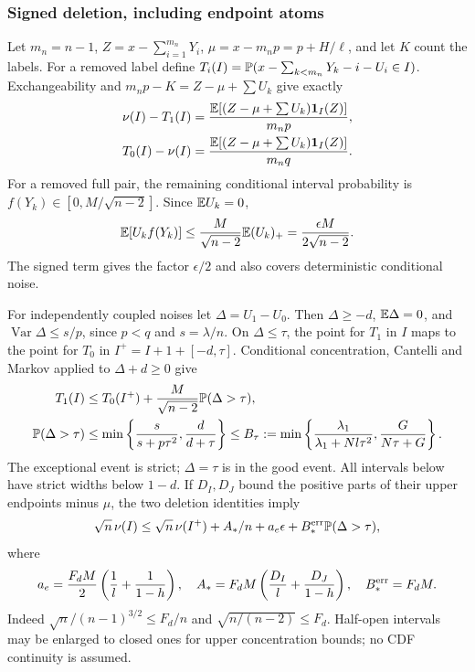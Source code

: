 \subsubsection{Signed deletion, including endpoint atoms}
\label{v9:confinement:deletion}
Let $m_n=n-1$, $Z=x-\sum_{i=1}^{m_n}Y_i$,
$\mu=x-m_np=p+H/\ell$, and let $K$ count the labels. For a removed label
define $T_i(I)=\mathbb P(x-\sum_{k<m_n}Y_k-i-U_i\in I)$.
Exchangeability and $m_np-K=Z-\mu+\sum U_k$ give exactly
\begin{align*}
 \nu(I)-T_1(I)&=\frac{\mathbb E[(Z-\mu+\sum U_k)\mathbf 1_I(Z)]}{m_np},\\
 T_0(I)-\nu(I)&=\frac{\mathbb E[(Z-\mu+\sum U_k)\mathbf 1_I(Z)]}{m_nq}.
\end{align*}
For a removed full pair, the remaining conditional interval probability
is $f(Y_k)\in[0,M/\sqrt{n-2}]$. Since $\mathbb E U_k=0$,
\[
 \mathbb E[U_kf(Y_k)]\le\frac{M}{\sqrt{n-2}}\mathbb E(U_k)_+
                  =\frac{\epsilon M}{2\sqrt{n-2}}.
\]
The signed term gives the factor $\epsilon/2$ and also covers
deterministic conditional noise.

For independently coupled noises let $\Delta=U_1-U_0$.
Then $\Delta\ge-d$, $\mathbb E\Delta=0$, and
$\operatorname{Var}\Delta\le s/p$, since $p<q$ and $s=\lambda/n$.
On $\Delta\le\tau$, the point for $T_1$ in $I$ maps to the point for
$T_0$ in $I^+=I+1+[-d,\tau]$. Conditional concentration, Cantelli and
Markov applied to $\Delta+d\ge0$ give
\begin{align}
 T_1(I)&\le T_0(I^+)+\frac M{\sqrt{n-2}}\mathbb P(\Delta>\tau),\notag\\
 \mathbb P(\Delta>\tau)&\le\min\left\{\frac{s}{s+p\tau^2},\frac d{d+\tau}\right\}
 \le B_\tau:=\min\left\{\frac{\lambda_1}{\lambda_1+Nl\tau^2},
                         \frac G{N\tau+G}\right\}.
 \label{v9:confinement:bad}
\end{align}
The exceptional event is strict; $\Delta=\tau$ is in the good event.
All intervals below have strict widths below $1-d$. If $D_I,D_J$
bound the positive parts of their upper endpoints minus $\mu$, the two
deletion identities imply
\begin{equation}\label{v9:confinement:deletion-error}
 \sqrt n\,\nu(I)\le\sqrt n\,\nu(I^+)+A_*/n+
             a_e\epsilon+B_*^{\rm err}\mathbb P(\Delta>\tau),
\end{equation}
where
\[
 a_e=\frac{F_dM}{2}\left(\frac1l+\frac1{1-h}\right),\quad
 A_*=F_dM\left(\frac{D_I}l+\frac{D_J}{1-h}\right),\quad
 B_*^{\rm err}=F_dM.
\]
Indeed $\sqrt n/(n-1)^{3/2}\le F_d/n$ and
$\sqrt{n/(n-2)}\le F_d$. Half-open intervals may be enlarged to closed
ones for upper concentration bounds; no CDF continuity is assumed.

